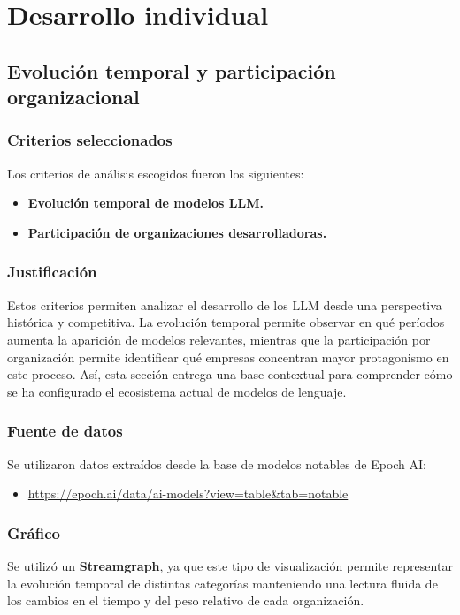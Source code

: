 \documentclass[12pt,a4paper]{article}
\begin{document}
\section{Desarrollo individual}

\subsection{Evolución temporal y participación organizacional}

\subsubsection*{Criterios seleccionados}
Los criterios de análisis escogidos fueron los siguientes:

\begin{itemize}[leftmargin=1.2cm]
    \item \textbf{Evolución temporal de modelos LLM.}
    \item \textbf{Participación de organizaciones desarrolladoras.}
\end{itemize}

\subsubsection*{Justificación}
Estos criterios permiten analizar el desarrollo de los LLM desde una perspectiva histórica y competitiva. La evolución temporal permite observar en qué períodos aumenta la aparición de modelos relevantes, mientras que la participación por organización permite identificar qué empresas concentran mayor protagonismo en este proceso. Así, esta sección entrega una base contextual para comprender cómo se ha configurado el ecosistema actual de modelos de lenguaje.

\subsubsection*{Fuente de datos}
Se utilizaron datos extraídos desde la base de modelos notables de Epoch AI:

\begin{itemize}[leftmargin=1.2cm]
    \item \url{https://epoch.ai/data/ai-models?view=table&tab=notable}
\end{itemize}

\subsubsection*{Gráfico}
Se utilizó un \textbf{Streamgraph}, ya que este tipo de visualización permite representar la evolución temporal de distintas categorías manteniendo una lectura fluida de los cambios en el tiempo y del peso relativo de cada organización.
\end{document}
